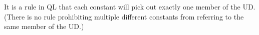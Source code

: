 It is a rule in QL that each constant will pick out exactly one member of the UD. (There is no rule prohibiting multiple different constants from referring to the same member of the UD.)

%
%
%
%
%
%

